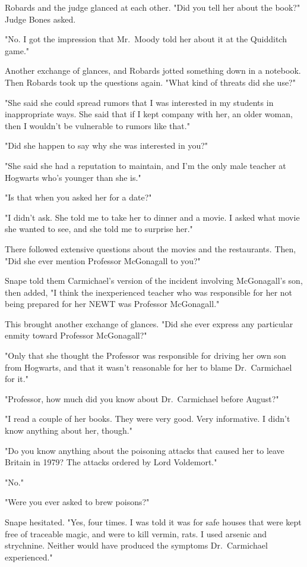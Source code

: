 Robards and the judge glanced at each other. "Did you tell her about the book?" Judge Bones asked.

"No. I got the impression that Mr.~Moody told her about it at the Quidditch game."

Another exchange of glances, and Robards jotted something down in a notebook. Then Robards took up the questions again. "What kind of threats did she use?"

"She said she could spread rumors that I was interested in my students in inappropriate ways. She said that if I kept company with her, an older woman, then I wouldn't be vulnerable to rumors like that."

"Did she happen to say why she was interested in you?"

"She said she had a reputation to maintain, and I'm the only male teacher at Hogwarts who's younger than she is."

"Is that when you asked her for a date?"

"I didn't ask. She told me to take her to dinner and a movie. I asked what movie she wanted to see, and she told me to surprise her."

There followed extensive questions about the movies and the restaurants. Then, "Did she ever mention Professor McGonagall to you?"

Snape told them Carmichael's version of the incident involving McGonagall's son, then added, "I think the inexperienced teacher who was responsible for her not being prepared for her NEWT was Professor McGonagall."

This brought another exchange of glances. "Did she ever express any particular enmity toward Professor McGonagall?"

"Only that she thought the Professor was responsible for driving her own son from Hogwarts, and that it wasn't reasonable for her to blame Dr.~Carmichael for it."

"Professor, how much did you know about Dr.~Carmichael before August?"

"I read a couple of her books. They were very good. Very informative. I didn't know anything about her, though."

"Do you know anything about the poisoning attacks that caused her to leave Britain in 1979? The attacks ordered by Lord Voldemort."

"No."

"Were you ever asked to brew poisons?"

Snape hesitated. "Yes, four times. I was told it was for safe houses that were kept free of traceable magic, and were to kill vermin, rats. I used arsenic and strychnine. Neither would have produced the symptoms Dr.~Carmichael experienced."

